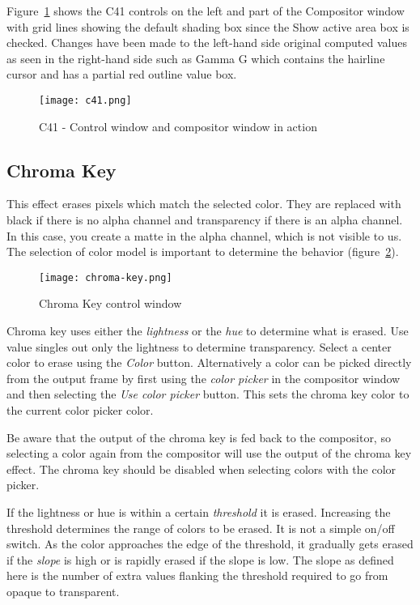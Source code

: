 Figure~\ref{fig:c41} shows the C41 controls on the left and part of the Compositor window with grid lines showing the default shading box since the Show active area box is checked. Changes have been made to the left-hand side original computed values as seen in the right-hand side such as Gamma G which contains the hairline cursor and has a partial red outline value box.

\begin{figure}[htpb]
    \centering
    \texttt{[image: c41.png]}
    \caption{C41 - Control window and compositor window in action}
    \label{fig:c41}
\end{figure}

\subsection{Chroma Key}%
\label{sub:chroma_key}

This effect erases pixels which match the selected color. They are replaced with black if there is no alpha channel and transparency if there is an alpha channel. In this case, you create a matte in the alpha channel, which is not visible to us. The selection of color model is important to determine the behavior (figure~\ref{fig:chroma-key}).

\begin{figure}[htpb]
    \centering
    \texttt{[image: chroma-key.png]}
    \caption{Chroma Key control window}
    \label{fig:chroma-key}
\end{figure}

Chroma key uses either the \textit{lightness} or the \textit{hue} to determine what is erased. Use value singles out only the lightness to determine transparency.
Select a center color to erase using the \textit{Color} button. Alternatively a color can be picked directly from the output frame by first using the \textit{color picker} in the compositor window and then selecting the \textit{Use color picker} button. This sets the chroma key color to the current color picker color.

Be aware that the output of the chroma key is fed back to the compositor, so selecting a color again from the compositor will use the output of the chroma key effect. The chroma key should be disabled when selecting colors with the color picker.

If the lightness or hue is within a certain \textit{threshold} it is erased. Increasing the threshold determines the range of colors to be erased. It is not a simple on/off switch. As the color approaches the edge of the threshold, it gradually gets erased if the \textit{slope} is high or is rapidly erased if the slope is low. The slope as defined here is the number of extra values flanking the threshold required to go from opaque to transparent.

